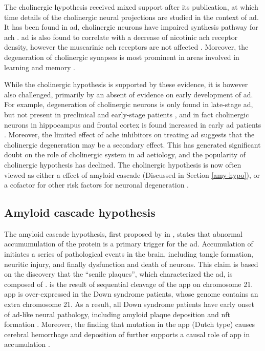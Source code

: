 The cholinergic hypothesis received mixed support after its publication, at which time details of the cholinergic neural projections are studied in the context of \gls{ad}. It has been found in \gls{ad}, cholinergic neurons have impaired synthesis pathway for \gls{ach} \citep{milner87}. \gls{ad} is also found to correlate with a decrease of nicotinic \gls{ach} receptor density, however the muscarinic \gls{ach} receptors are not affected \citep{nordberg92, burghaus00}. Moreover, the degeneration of cholinergic synapses is most prominent in areas involved in learning and memory \citep{geula96}. 

While the cholinergic hypothesis is supported by these evidence, it is however also challenged, primarily by an absent of evidence on early development of \gls{ad}. For example, degeneration of cholinergic neurons is only found in late-stage \gls{ad}, but not present in preclinical and early-stage patients \citep{davis99}, and in fact cholinergic neurons in hippocampus and frontal cortex is found increased in early \gls{ad} patients \citep{dekosky02}. Moreover, the limited effect of \gls{ache} inhibitors on treating \gls{ad} suggests that the cholinergic degeneration may be a secondary effect. This has generated significant doubt on the role of cholinergic system in \gls{ad} aetiology, and the popularity of cholinergic hypothesis has declined. The cholinergic hypothesis is now often viewed as either a effect of amyloid cascade (Discussed in Section \ref{amy-hypo}), or a cofactor for other risk factors for neuronal degeneration \citep{roberson97, contestabile11}.


\subsection{Amyloid cascade hypothesis\label{amy-hypo}}
The amyloid cascade hypothesis, first proposed by \citeauthor{hardy92} in \citeyear{hardy92}, states that abnormal accumumulation of the protein \abeta{} is a primary trigger for the \gls{ad}. Accumulation of \abeta{} initiates a series of pathological events in the brain, including tangle formation, neuritic injury, and finally dysfunction and death of neurons. This claim is based on the discovery that the ``senile plaques'', which characterized the \gls{ad}, is composed of \abeta{} \citep{masters85}. \abeta{} is the result of sequential cleavage of the \gls{app} on chromosome 21. \Gls{app} is over-expressed in the Down syndrome patients, whose genome contains an extra chromosome 21. As a result, all Down syndrome patients have early onset of \gls{ad}-like neural pathology, including amyloid plaque deposition and \gls{nft} formation \citep{wisniewski85, hardy02}. Moreover, the finding that mutation in the \gls{app} (Dutch type) causes cerebral hemorrhage and deposition of \abeta{} further supports a causal role of \gls{app} in \abeta{} accumulation \citep{hardy02}.

